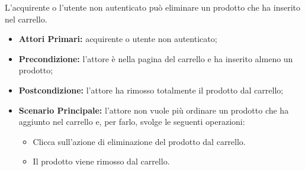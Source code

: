 
L'acquirente o l'utente non autenticato può eliminare un prodotto che ha inserito nel carrello.
\begin{itemize}
    \item \textbf{Attori Primari:} acquirente o utente non autenticato;
    \item \textbf{Precondizione:} l'attore è nella pagina del carrello e ha inserito almeno un prodotto;
    \item \textbf{Postcondizione:} l'attore ha rimosso totalmente il prodotto dal carrello;
    \item \textbf{Scenario Principale:} l'attore non vuole più ordinare un prodotto che ha aggiunto nel carrello e, per farlo, svolge le seguenti operazioni:
    \begin{itemize}
        \item Clicca sull'azione di eliminazione del prodotto dal carrello.
        \item Il prodotto viene rimosso dal carrello.
    \end{itemize}
\end{itemize}





